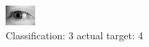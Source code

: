 \begin{figure}[h!]
\begin{center}
\includegraphics[width=0.60\columnwidth]{figures/ID3237_class_3_target_4.png}
\end{center}
\caption{ Classification: 3 actual target: 4}
\label{fig:ID3237_class_3_target_4}
\end{figure}

